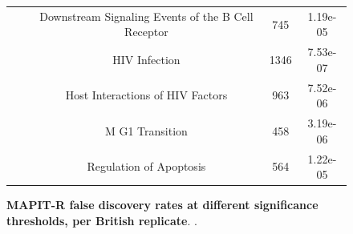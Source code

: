 \documentclass[12pt,a4paper]{article}
\begin{document}
\begin{figure}[ht]
{{\begin{tabular}{cc|ccc}
 & & Downstream Signaling Events of the B Cell Receptor & 745 & 1.19e-05 \\
 & & HIV Infection & 1346 & 7.53e-07 \\
 & & Host Interactions of HIV Factors & 963 & 7.52e-06 \\
 & & M G1 Transition & 458 & 3.19e-06 \\
 & & Regulation of Apoptosis & 564 & 1.22e-05 \\
  \hline
\end{tabular}}}
\caption[TBD]{\textbf{MAPIT-R false discovery rates at different significance thresholds, per British replicate}. .}
\label{InterPath-Supp-Figure-Prot-Heatplots-African}
\end{figure}
\clearpage
\addtocounter{figure}{-1}
\addtocounter{CharNumber5}{1}

\end{document}
